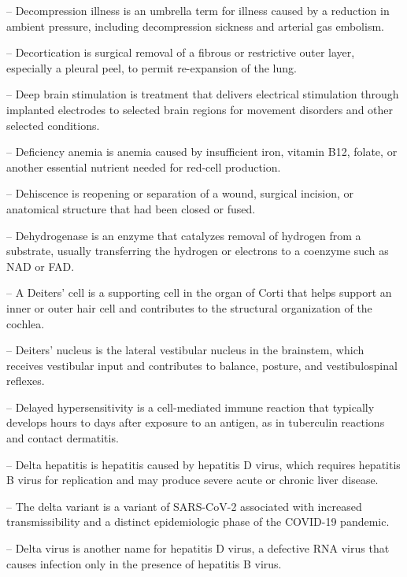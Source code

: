 -- Decompression illness is an umbrella term for illness caused by a reduction in ambient pressure, including decompression sickness and arterial gas embolism.

-- Decortication is surgical removal of a fibrous or restrictive outer layer, especially a pleural peel, to permit re-expansion of the lung.

-- Deep brain stimulation is treatment that delivers electrical stimulation through implanted electrodes to selected brain regions for movement disorders and other selected conditions.

-- Deficiency anemia is anemia caused by insufficient iron, vitamin B12, folate, or another essential nutrient needed for red-cell production.

-- Dehiscence is reopening or separation of a wound, surgical incision, or anatomical structure that had been closed or fused.

-- Dehydrogenase is an enzyme that catalyzes removal of hydrogen from a substrate, usually transferring the hydrogen or electrons to a coenzyme such as NAD or FAD.

-- A Deiters' cell is a supporting cell in the organ of Corti that helps support an inner or outer hair cell and contributes to the structural organization of the cochlea.

-- Deiters' nucleus is the lateral vestibular nucleus in the brainstem, which receives vestibular input and contributes to balance, posture, and vestibulospinal reflexes.

-- Delayed hypersensitivity is a cell-mediated immune reaction that typically develops hours to days after exposure to an antigen, as in tuberculin reactions and contact dermatitis.

-- Delta hepatitis is hepatitis caused by hepatitis D virus, which requires hepatitis B virus for replication and may produce severe acute or chronic liver disease.

-- The delta variant is a variant of SARS-CoV-2 associated with increased transmissibility and a distinct epidemiologic phase of the COVID-19 pandemic.

-- Delta virus is another name for hepatitis D virus, a defective RNA virus that causes infection only in the presence of hepatitis B virus.

